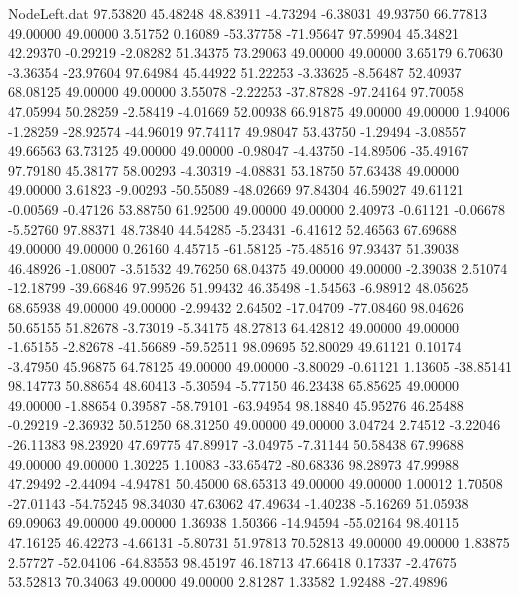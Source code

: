 \begin{filecontents}{NodeLeft.dat}
  97.53820   45.48248   48.83911    -4.73294   -6.38031   49.93750   66.77813   49.00000   49.00000    3.51752    0.16089  -53.37758  -71.95647
  97.59904   45.34821   42.29370    -0.29219   -2.08282   51.34375   73.29063   49.00000   49.00000    3.65179    6.70630   -3.36354  -23.97604
  97.64984   45.44922   51.22253    -3.33625   -8.56487   52.40937   68.08125   49.00000   49.00000    3.55078   -2.22253  -37.87828  -97.24164
  97.70058   47.05994   50.28259    -2.58419   -4.01669   52.00938   66.91875   49.00000   49.00000    1.94006   -1.28259  -28.92574  -44.96019
  97.74117   49.98047   53.43750    -1.29494   -3.08557   49.66563   63.73125   49.00000   49.00000   -0.98047   -4.43750  -14.89506  -35.49167
  97.79180   45.38177   58.00293    -4.30319   -4.08831   53.18750   57.63438   49.00000   49.00000    3.61823   -9.00293  -50.55089  -48.02669
  97.84304   46.59027   49.61121    -0.00569   -0.47126   53.88750   61.92500   49.00000   49.00000    2.40973   -0.61121   -0.06678   -5.52760
  97.88371   48.73840   44.54285    -5.23431   -6.41612   52.46563   67.69688   49.00000   49.00000    0.26160    4.45715  -61.58125  -75.48516
  97.93437   51.39038   46.48926    -1.08007   -3.51532   49.76250   68.04375   49.00000   49.00000   -2.39038    2.51074  -12.18799  -39.66846
  97.99526   51.99432   46.35498    -1.54563   -6.98912   48.05625   68.65938   49.00000   49.00000   -2.99432    2.64502  -17.04709  -77.08460
  98.04626   50.65155   51.82678    -3.73019   -5.34175   48.27813   64.42812   49.00000   49.00000   -1.65155   -2.82678  -41.56689  -59.52511
  98.09695   52.80029   49.61121     0.10174   -3.47950   45.96875   64.78125   49.00000   49.00000   -3.80029   -0.61121    1.13605  -38.85141
  98.14773   50.88654   48.60413    -5.30594   -5.77150   46.23438   65.85625   49.00000   49.00000   -1.88654    0.39587  -58.79101  -63.94954
  98.18840   45.95276   46.25488    -0.29219   -2.36932   50.51250   68.31250   49.00000   49.00000    3.04724    2.74512   -3.22046  -26.11383
  98.23920   47.69775   47.89917    -3.04975   -7.31144   50.58438   67.99688   49.00000   49.00000    1.30225    1.10083  -33.65472  -80.68336
  98.28973   47.99988   47.29492    -2.44094   -4.94781   50.45000   68.65313   49.00000   49.00000    1.00012    1.70508  -27.01143  -54.75245
  98.34030   47.63062   47.49634    -1.40238   -5.16269   51.05938   69.09063   49.00000   49.00000    1.36938    1.50366  -14.94594  -55.02164
  98.40115   47.16125   46.42273    -4.66131   -5.80731   51.97813   70.52813   49.00000   49.00000    1.83875    2.57727  -52.04106  -64.83553
  98.45197   46.18713   47.66418     0.17337   -2.47675   53.52813   70.34063   49.00000   49.00000    2.81287    1.33582    1.92488  -27.49896

\end{filecontents}
